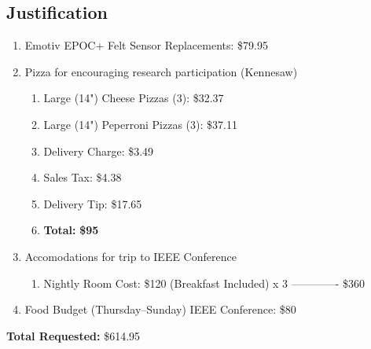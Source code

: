 \documentclass{article}
\begin{document}
\subsection*{Justification}
\begin{enumerate}
    \item Emotiv EPOC+ Felt Sensor Replacements: \$79.95
    \item Pizza for encouraging research participation (Kennesaw) 
    \begin{enumerate}
        \item[] Large (14") Cheese Pizzas (3): \$32.37
        \item[] Large (14") Peperroni Pizzas (3): \$37.11
        \item[] Delivery Charge: \$3.49
        \item[] Sales Tax: \$4.38
        \item[] Delivery Tip: \$17.65
        \item[] \textbf{Total:} \textbf{\$95}
    \end{enumerate}
       
      \item Accomodations for trip to IEEE Conference
      \begin{enumerate}
          \item[] Nightly Room Cost: \$120 (Breakfast Included)
          \newline
          x 3
          \newline
        -------------
        \newline
        \$360
      \end{enumerate}
      \item Food Budget (Thursday--Sunday) IEEE Conference: \$80
\end{enumerate}
\textbf{Total Requested:} \$614.95
\end{document}
